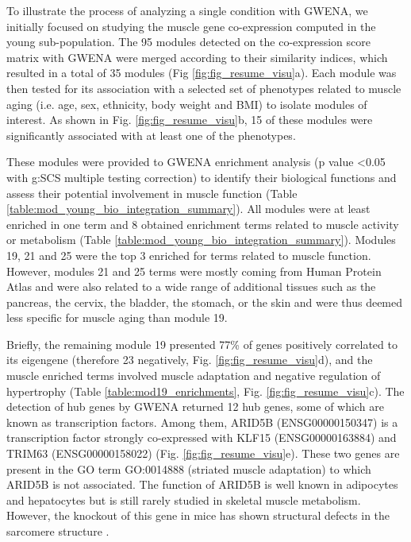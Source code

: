 To illustrate the process of analyzing a single condition with GWENA, we initially focused on studying the muscle gene co-expression computed in the young sub-population. The 95 modules detected on the co-expression score matrix with GWENA were merged according to their similarity indices, which resulted in a total of 35 modules (Fig \ref{fig:fig_resume_visu}a). Each module was then tested for its association with a selected set of phenotypes related to muscle aging (i.e. age, sex, ethnicity, body weight and BMI) to isolate modules of interest. As shown in Fig. \ref{fig:fig_resume_visu}b, 15 of these modules were significantly associated with at least one of the phenotypes.

These modules were provided to GWENA enrichment analysis (p value \textless 0.05 with g:SCS multiple testing correction) to identify their biological functions and assess their potential involvement in muscle function (Table \ref{table:mod_young_bio_integration_summary}). All modules were at least enriched in one term and 8 obtained enrichment terms related to muscle activity or metabolism (Table \ref{table:mod_young_bio_integration_summary}). Modules 19, 21 and 25 were the top 3 enriched for terms related to muscle function. However, modules 21 and 25 terms were mostly coming from Human Protein Atlas and were also related to a wide range of additional tissues such as the pancreas, the cervix, the bladder, the stomach, or the skin and were thus deemed less specific for muscle aging than module 19. 

Briefly, the remaining module 19 presented 77\% of genes positively correlated to its eigengene (therefore 23 negatively, Fig. \ref{fig:fig_resume_visu}d), and the muscle enriched terms involved muscle adaptation and negative regulation of hypertrophy (Table \ref{table:mod19_enrichments}, Fig. \ref{fig:fig_resume_visu}c). The detection of hub genes by GWENA returned 12 hub genes, some of which are known as transcription factors. Among them, ARID5B (ENSG00000150347) is a transcription factor strongly co-expressed with KLF15 (ENSG00000163884) and TRIM63 (ENSG00000158022) (Fig. \ref{fig:fig_resume_visu}e). These two genes are present in the GO term GO:0014888 (striated muscle adaptation) to which ARID5B is not associated. The function of ARID5B is well known in adipocytes and hepatocytes but is still rarely studied in skeletal muscle metabolism. However, the knockout of this gene in mice has shown structural defects in the sarcomere structure .

